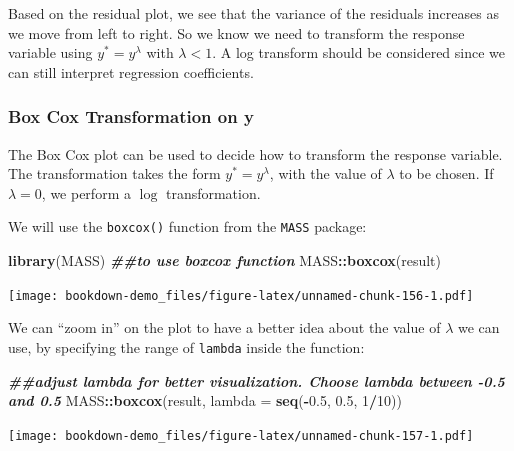 \documentclass[
]{book}
\newenvironment{Shaded}{\begin{snugshade}}{\end{snugshade}}
\newcommand{\AttributeTok}[1]{\textcolor[rgb]{0.13,0.29,0.53}{#1}}
\newcommand{\DecValTok}[1]{\textcolor[rgb]{0.00,0.00,0.81}{#1}}
\newcommand{\DocumentationTok}[1]{\textcolor[rgb]{0.56,0.35,0.01}{\textbf{\textit{#1}}}}
\newcommand{\FloatTok}[1]{\textcolor[rgb]{0.00,0.00,0.81}{#1}}
\newcommand{\FunctionTok}[1]{\textcolor[rgb]{0.13,0.29,0.53}{\textbf{#1}}}
\newcommand{\NormalTok}[1]{#1}
\newcommand{\SpecialCharTok}[1]{\textcolor[rgb]{0.81,0.36,0.00}{\textbf{#1}}}
\begin{document}
Based on the residual plot, we see that the variance of the residuals increases as we move from left to right. So we know we need to transform the response variable using \(y^* = y^\lambda\) with \(\lambda < 1\). A log transform should be considered since we can still interpret regression coefficients.

\hypertarget{box-cox-transformation-on-y}{%
\subsubsection*{Box Cox Transformation on y}\label{box-cox-transformation-on-y}}

The Box Cox plot can be used to decide how to transform the response variable. The transformation takes the form \(y^* = y^{\lambda}\), with the value of \(\lambda\) to be chosen. If \(\lambda = 0\), we perform a \(\log\) transformation.

We will use the \texttt{boxcox()} function from the \texttt{MASS} package:

\begin{Shaded}
\begin{Highlighting}[]
\FunctionTok{library}\NormalTok{(MASS) }\DocumentationTok{\#\#to use boxcox function}
\NormalTok{MASS}\SpecialCharTok{::}\FunctionTok{boxcox}\NormalTok{(result)}
\end{Highlighting}
\end{Shaded}

\texttt{[image: bookdown-demo\_files/figure-latex/unnamed-chunk-156-1.pdf]}

We can ``zoom in'' on the plot to have a better idea about the value of \(\lambda\) we can use, by specifying the range of \texttt{lambda} inside the function:

\begin{Shaded}
\begin{Highlighting}[]
\DocumentationTok{\#\#adjust lambda for better visualization. Choose lambda between {-}0.5 and 0.5}
\NormalTok{MASS}\SpecialCharTok{::}\FunctionTok{boxcox}\NormalTok{(result, }\AttributeTok{lambda =} \FunctionTok{seq}\NormalTok{(}\SpecialCharTok{{-}}\FloatTok{0.5}\NormalTok{, }\FloatTok{0.5}\NormalTok{, }\DecValTok{1}\SpecialCharTok{/}\DecValTok{10}\NormalTok{)) }
\end{Highlighting}
\end{Shaded}

\texttt{[image: bookdown-demo\_files/figure-latex/unnamed-chunk-157-1.pdf]}
\end{document}
